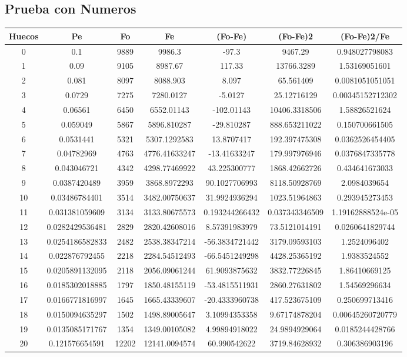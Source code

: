 \documentclass{article}
\begin{document}
\subsection{Prueba con Numeros}
\begin{tabular}{|c|c|c|c|c|c|c|}
Huecos&Pe&Fo&Fe&(Fo{-}Fe)&(Fo{-}Fe)2&(Fo{-}Fe)2/Fe\\
\hline
0&0.1&9889&9986.3&{-}97.3&9467.29&0.948027798083\\
\hline
1&0.09&9105&8987.67&117.33&13766.3289&1.53169051601\\
\hline
2&0.081&8097&8088.903&8.097&65.561409&0.0081051051051\\
\hline
3&0.0729&7275&7280.0127&{-}5.0127&25.12716129&0.00345152712302\\
\hline
4&0.06561&6450&6552.01143&{-}102.01143&10406.3318506&1.58826521624\\
\hline
5&0.059049&5867&5896.810287&{-}29.810287&888.653211022&0.150700661505\\
\hline
6&0.0531441&5321&5307.1292583&13.8707417&192.397475308&0.0362526454405\\
\hline
7&0.04782969&4763&4776.41633247&{-}13.41633247&179.997976946&0.0376847335778\\
\hline
8&0.043046721&4342&4298.77469922&43.225300777&1868.42662726&0.434641673033\\
\hline
9&0.0387420489&3959&3868.8972293&90.1027706993&8118.50928769&2.0984039654\\
\hline
10&0.03486784401&3514&3482.00750637&31.9924936294&1023.51964863&0.293945273453\\
\hline
11&0.031381059609&3134&3133.80675573&0.193244266432&0.037343346509&1.19162888524e{-}05\\
\hline
12&0.0282429536481&2829&2820.42608016&8.57391983979&73.5121014191&0.0260641829744\\
\hline
13&0.0254186582833&2482&2538.38347214&{-}56.3834721442&3179.09593103&1.2524096402\\
\hline
14&0.022876792455&2218&2284.54512493&{-}66.5451249298&4428.25365192&1.9383524552\\
\hline
15&0.0205891132095&2118&2056.09061244&61.9093875632&3832.77226845&1.86410669125\\
\hline
16&0.0185302018885&1797&1850.48155119&{-}53.4815511931&2860.27631802&1.54569296634\\
\hline
17&0.0166771816997&1645&1665.43339607&{-}20.4333960738&417.523675109&0.250699713416\\
\hline
18&0.0150094635297&1502&1498.89005647&3.10994353358&9.67174878204&0.00645260720779\\
\hline
19&0.0135085171767&1354&1349.00105082&4.99894918022&24.9894929064&0.0185244428766\\
\hline
20&0.121576654591&12202&12141.0094574&60.990542622&3719.84628932&0.306386903196\\
\end{tabular}
\end{document}

